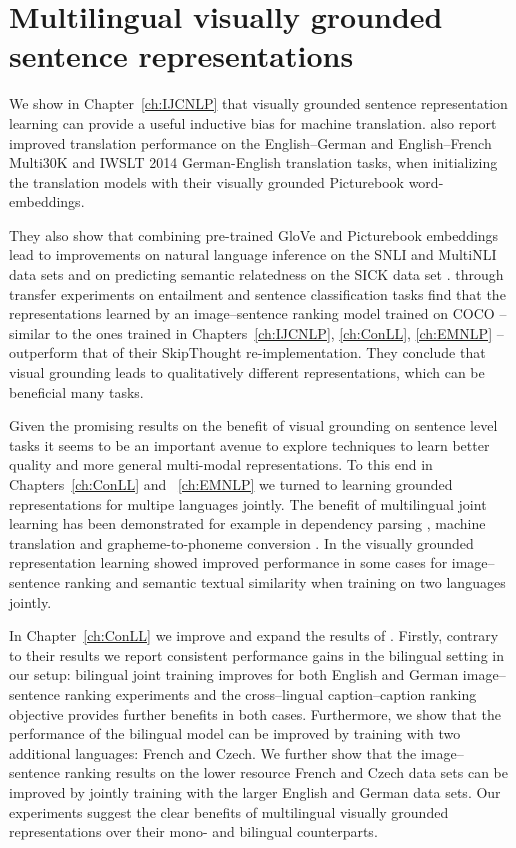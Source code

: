 \section{Multilingual visually grounded sentence representations}

We show in Chapter~\ref{ch:IJCNLP} that visually grounded sentence representation learning
can provide a useful inductive bias for machine translation. \cite{kiros2018illustrative} also report 
improved translation performance on the English--German and English--French Multi30K 
and IWSLT 2014 German-English  \citep{cettolo2014report} translation tasks, when initializing
the translation models with their visually grounded Picturebook word-embeddings. 

They also show that
combining pre-trained GloVe \citep{pennington2014glove} and Picturebook embeddings lead 
to improvements on natural language inference on the SNLI 
\citep{bowman2015large} and MultiNLI \cite{williams2017broad} data sets and on predicting
semantic relatedness on the SICK data set \citep{marelli2014semeval}. 
\cite{kiela2017learning} through transfer experiments on
entailment and sentence classification tasks find that the representations learned by an 
image--sentence ranking model trained on COCO -- similar to the ones trained in Chapters~\ref{ch:IJCNLP}, 
\ref{ch:ConLL}, \ref{ch:EMNLP}  -- outperform that of their SkipThought \citep{kiros2015skip} 
re-implementation. They conclude that visual grounding leads to qualitatively different representations, which
can be beneficial many tasks.

Given the promising results on the benefit of visual grounding on sentence level tasks it seems
to be an important avenue to explore techniques to learn better quality and more 
general multi-modal representations. To this end in Chapters~\ref{ch:ConLL} and ~\ref{ch:EMNLP} 
we turned to learning grounded representations for multipe languages jointly. 
The benefit of multilingual joint learning has been demonstrated for example in dependency parsing
 \citep{ammar2016many}, machine translation \citep{johnson2016google} and grapheme-to-phoneme
 conversion \citep{peters2017massively}. 
 In the visually grounded representation learning \citep{gella2017image} showed improved 
 performance in some cases for image--sentence ranking and semantic textual similarity when training
 on two languages jointly.
 
  In Chapter~\ref{ch:ConLL} we improve and expand the results of 
 \cite{gella2017image}. Firstly, contrary to their results we report consistent performance gains in the
 bilingual setting in our setup: bilingual joint training improves for both English and German 
 image--sentence ranking experiments and the cross--lingual caption--caption ranking 
 objective provides further benefits in both cases. 
 Furthermore, we show that the performance of the bilingual model can be improved by training
 with two additional languages: French and Czech. We further show that the image--sentence ranking
 results on the lower resource French and Czech data sets can be improved by jointly training with the
 larger English and German data sets. 
Our experiments suggest the clear benefits of multilingual visually grounded representations over 
their mono- and bilingual counterparts.
 
